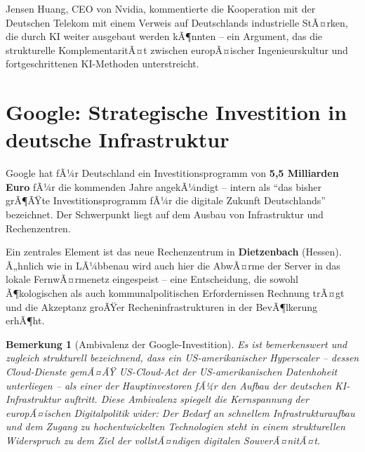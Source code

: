 ﻿\documentclass[12pt, a4paper, openany]{report}
\newtheorem{remark}[theorem]{Bemerkung}
\begin{document}
Jensen Huang, CEO von Nvidia, kommentierte die Kooperation mit der
Deutschen Telekom mit einem Verweis auf Deutschlands industrielle StÃ¤rken,
die durch KI weiter ausgebaut werden kÃ¶nnten -- ein Argument, das die
strukturelle KomplementaritÃ¤t zwischen europÃ¤ischer Ingenieurskultur und
fortgeschrittenen KI-Methoden unterstreicht.

\section{Google: Strategische Investition in deutsche Infrastruktur}
\label{sec:google_deutschland}

Google hat fÃ¼r Deutschland ein Investitionsprogramm von \textbf{5,5 Milliarden
	Euro} fÃ¼r die kommenden Jahre angekÃ¼ndigt -- intern als ``das bisher grÃ¶ÃŸte
Investitionsprogramm fÃ¼r die digitale Zukunft Deutschlands'' bezeichnet. Der
Schwerpunkt liegt auf dem Ausbau von Infrastruktur und Rechenzentren.

Ein zentrales Element ist das neue Rechenzentrum in \textbf{Dietzenbach}
(Hessen). Ã„hnlich wie in LÃ¼bbenau wird auch hier die AbwÃ¤rme der Server in
das lokale FernwÃ¤rmenetz eingespeist -- eine Entscheidung, die sowohl
Ã¶kologischen als auch kommunalpolitischen Erfordernissen Rechnung trÃ¤gt und
die Akzeptanz groÃŸer Recheninfrastrukturen in der BevÃ¶lkerung erhÃ¶ht.

\begin{remark}[Ambivalenz der Google-Investition]
	\label{rem:google_ambivalenz}
	Es ist bemerkenswert und zugleich strukturell bezeichnend, dass ein
	US-amerikanischer Hyperscaler -- dessen Cloud-Dienste gemÃ¤ÃŸ US-Cloud-Act
	der US-amerikanischen Datenhoheit unterliegen -- als einer der
	Hauptinvestoren fÃ¼r den Aufbau der deutschen KI-Infrastruktur auftritt.
	Diese Ambivalenz spiegelt die Kernspannung der europÃ¤ischen Digitalpolitik
	wider: Der Bedarf an schnellem Infrastrukturaufbau und dem Zugang zu
	hochentwickelten Technologien steht in einem strukturellen Widerspruch
	zu dem Ziel der vollstÃ¤ndigen digitalen SouverÃ¤nitÃ¤t.
\end{remark}
\end{document}
